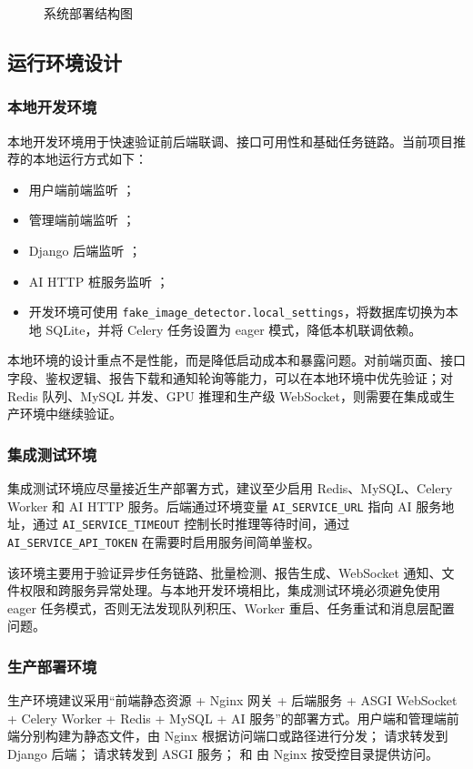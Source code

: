\begin{figure}[H]
    \centering
    \resizebox{0.98\textwidth}{!}{}
    \caption{系统部署结构图}
\end{figure}

\subsection{运行环境设计}
\subsubsection{本地开发环境}
本地开发环境用于快速验证前后端联调、接口可用性和基础任务链路。当前项目推荐的本地运行方式如下：
\begin{itemize}[leftmargin=2em]
    \item 用户端前端监听 ；
    \item 管理端前端监听 ；
    \item Django 后端监听 ；
    \item AI HTTP 桩服务监听 ；
    \item 开发环境可使用 \texttt{fake\_image\_detector.local\_settings}，将数据库切换为本地 SQLite，并将 Celery 任务设置为 eager 模式，降低本机联调依赖。
\end{itemize}

本地环境的设计重点不是性能，而是降低启动成本和暴露问题。对前端页面、接口字段、鉴权逻辑、报告下载和通知轮询等能力，可以在本地环境中优先验证；对 Redis 队列、MySQL 并发、GPU 推理和生产级 WebSocket，则需要在集成或生产环境中继续验证。

\subsubsection{集成测试环境}
集成测试环境应尽量接近生产部署方式，建议至少启用 Redis、MySQL、Celery Worker 和 AI HTTP 服务。后端通过环境变量 \texttt{AI\_SERVICE\_URL} 指向 AI 服务地址，通过 \texttt{AI\_SERVICE\_TIMEOUT} 控制长时推理等待时间，通过 \texttt{AI\_SERVICE\_API\_TOKEN} 在需要时启用服务间简单鉴权。

该环境主要用于验证异步任务链路、批量检测、报告生成、WebSocket 通知、文件权限和跨服务异常处理。与本地开发环境相比，集成测试环境必须避免使用 eager 任务模式，否则无法发现队列积压、Worker 重启、任务重试和消息层配置问题。

\subsubsection{生产部署环境}
生产环境建议采用“前端静态资源 + Nginx 网关 + 后端服务 + ASGI WebSocket + Celery Worker + Redis + MySQL + AI 服务”的部署方式。用户端和管理端前端分别构建为静态文件，由 Nginx 根据访问端口或路径进行分发； 请求转发到 Django 后端； 请求转发到 ASGI 服务； 和  由 Nginx 按受控目录提供访问。

